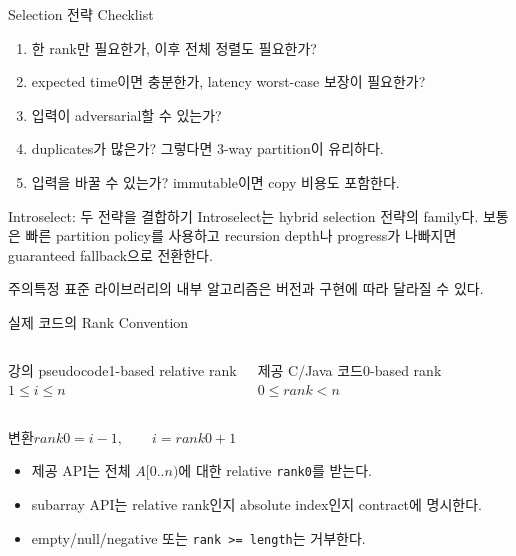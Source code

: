 \begin{frame}{Selection 전략 Checklist}
\begin{enumerate}\item 한 rank만 필요한가, 이후 전체 정렬도 필요한가?\item expected time이면 충분한가, latency worst-case 보장이 필요한가?\item 입력이 adversarial할 수 있는가?\item duplicates가 많은가? 그렇다면 3-way partition이 유리하다.\item 입력을 바꿀 수 있는가? immutable이면 copy 비용도 포함한다.\end{enumerate}
\end{frame}
\begin{frame}{Introselect: 두 전략을 결합하기}
\optional[선택 심화]\hfill
Introselect는 hybrid selection 전략의 family다. 보통은 빠른 partition policy를 사용하고 recursion depth나 progress가 나빠지면 guaranteed fallback으로 전환한다.
\begin{block}{주의}특정 표준 라이브러리의 내부 알고리즘은 버전과 구현에 따라 달라질 수 있다.\end{block}
\end{frame}
\begin{frame}{실제 코드의 Rank Convention}
\optional[선택 심화]\hfill
\small
\begin{columns}[T]\begin{block}{강의 pseudocode}1-based relative rank\\$1\le i\le n$\end{block}\begin{block}{제공 C/Java 코드}0-based rank\\$0\le rank<n$\end{block}\end{columns}
\begin{block}{변환}$rank0=i-1,\qquad i=rank0+1$\end{block}
\begin{itemize}
\item 제공 API는 전체 $A[0..n)$에 대한 relative \texttt{rank0}를 받는다.
\item subarray API는 relative rank인지 absolute index인지 contract에 명시한다.
\item empty/null/negative 또는 \texttt{rank >= length}는 거부한다.
\end{itemize}
\end{frame}
